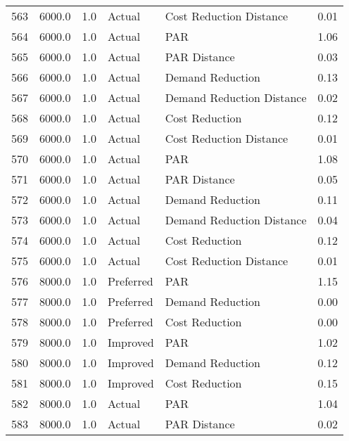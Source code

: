 \begin{longtable}{lrrllr}
563  &       6000.0 &     1.0 &         Actual &    Cost Reduction Distance &   0.01 \\
564  &       6000.0 &     1.0 &         Actual &                        PAR &   1.06 \\
565  &       6000.0 &     1.0 &         Actual &               PAR Distance &   0.03 \\
566  &       6000.0 &     1.0 &         Actual &           Demand Reduction &   0.13 \\
567  &       6000.0 &     1.0 &         Actual &  Demand Reduction Distance &   0.02 \\
568  &       6000.0 &     1.0 &         Actual &             Cost Reduction &   0.12 \\
569  &       6000.0 &     1.0 &         Actual &    Cost Reduction Distance &   0.01 \\
570  &       6000.0 &     1.0 &         Actual &                        PAR &   1.08 \\
571  &       6000.0 &     1.0 &         Actual &               PAR Distance &   0.05 \\
572  &       6000.0 &     1.0 &         Actual &           Demand Reduction &   0.11 \\
573  &       6000.0 &     1.0 &         Actual &  Demand Reduction Distance &   0.04 \\
574  &       6000.0 &     1.0 &         Actual &             Cost Reduction &   0.12 \\
575  &       6000.0 &     1.0 &         Actual &    Cost Reduction Distance &   0.01 \\
576  &       8000.0 &     1.0 &      Preferred &                        PAR &   1.15 \\
577  &       8000.0 &     1.0 &      Preferred &           Demand Reduction &   0.00 \\
578  &       8000.0 &     1.0 &      Preferred &             Cost Reduction &   0.00 \\
579  &       8000.0 &     1.0 &       Improved &                        PAR &   1.02 \\
580  &       8000.0 &     1.0 &       Improved &           Demand Reduction &   0.12 \\
581  &       8000.0 &     1.0 &       Improved &             Cost Reduction &   0.15 \\
582  &       8000.0 &     1.0 &         Actual &                        PAR &   1.04 \\
583  &       8000.0 &     1.0 &         Actual &               PAR Distance &   0.02 \\

\end{longtable}
